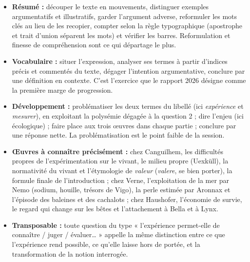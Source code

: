 \documentclass[11pt,a4paper]{article}
\providecommand{\tightlist}{\setlength{\itemsep}{0pt}\setlength{\parskip}{0pt}}
\begin{document}
\begin{itemize}
\tightlist
\item
  \textbf{Résumé :} découper le texte en mouvements, distinguer exemples argumentatifs et illustratifs, garder l'argument adverse, reformuler les mots clés au lieu de les recopier, compter selon la règle typographique (apostrophe et trait d'union séparent les mots) et vérifier les barres. Reformulation et finesse de compréhension sont ce qui départage le plus.
\item
  \textbf{Vocabulaire :} situer l'expression, analyser ses termes à partir d'indices précis et commentés du texte, dégager l'intention argumentative, conclure par une définition en contexte. C'est l'exercice que le rapport 2026 désigne comme la première marge de progression.
\item
  \textbf{Développement :} problématiser les deux termes du libellé (ici \emph{expérience} et \emph{mesurer}), en exploitant la polysémie dégagée à la question 2 ; dire l'enjeu (ici écologique) ; faire place aux trois œuvres dans chaque partie ; conclure par une réponse nette. La problématisation est le point faible de la session.
\item
  \textbf{Œuvres à connaître précisément :} chez Canguilhem, les difficultés propres de l'expérimentation sur le vivant, le milieu propre (Uexküll), la normativité du vivant et l'étymologie de \emph{valeur} (\emph{valere}, se bien porter), la formule finale de l'introduction ; chez Verne, l'exploitation de la mer par Nemo (sodium, houille, trésors de Vigo), la perle estimée par Aronnax et l'épisode des baleines et des cachalots ; chez Haushofer, l'économie de survie, le regard qui change sur les bêtes et l'attachement à Bella et à Lynx.
\item
  \textbf{Transposable :} toute question du type « l'expérience permet-elle de connaître / juger / évaluer\ldots{} » appelle la même distinction entre ce que l'expérience rend possible, ce qu'elle laisse hors de portée, et la transformation de la notion interrogée.
\end{itemize}
\end{document}
